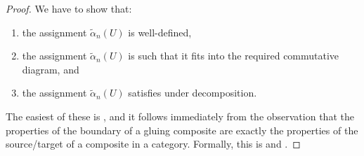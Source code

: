 \documentclass[12pt,a4paper]{article}
\numberwithin{equation}{section}
\begin{document}
\begin{proof}
    We have to show that:
    \begin{enumerate}
        \item\label{it:well-defined} the assignment $\tilde{\alpha}_n (U)$ is well-defined,
        \item\label{it:boundaries} the assignment $\tilde{\alpha}_n (U)$ is such that it fits into the required commutative diagram, and
        \item\label{it:decomposition} the assignment $\tilde{\alpha}_n (U)$ satisfies  under decomposition.
    \end{enumerate}

    The easiest of these is , and it follows immediately from the observation that the properties of the boundary of a gluing composite are exactly the properties of the source/target of a composite in a category. Formally, this is \cite[Lem.\,3.1.5]{hadzihasanovic} and \cite[Lem.\,3.1.15]{hadzihasanovic}.


\end{proof}
\end{document}
